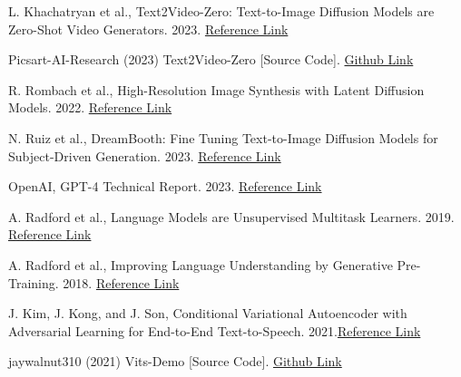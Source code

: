 \documentclass[conference]{IEEEtran}
\begin{document}
\begin{thebibliography}{00}

 L. Khachatryan et al., Text2Video-Zero: Text-to-Image Diffusion Models are Zero-Shot Video Generators. 2023. \href{https://arxiv.org/pdf/2303.13439.pdf}{Reference Link}

 Picsart-AI-Research (2023) Text2Video-Zero [Source Code]. \href{https://github.com/Picsart-AI-Research/Text2Video-Zero}{Github Link}

 R. Rombach et al., High-Resolution Image Synthesis with Latent Diffusion Models. 2022. \href{https://arxiv.org/pdf/2112.10752.pdf}{Reference Link}

 N. Ruiz et al., DreamBooth: Fine Tuning Text-to-Image Diffusion Models for Subject-Driven Generation. 2023. \href{https://arxiv.org/pdf/2208.12242.pdf}{Reference Link}

 OpenAI, GPT-4 Technical Report. 2023. \href{https://arxiv.org/pdf/2303.08774.pdf}{Reference Link}

 A. Radford et al., Language Models are Unsupervised Multitask Learners. 2019. \href{https://d4mucfpksywv.cloudfront.net/better-language-models/language_models_are_unsupervised_multitask_learners.pdf}{Reference Link}

 A. Radford et al., Improving Language Understanding by Generative Pre-Training. 2018. \href{https://s3-us-west-2.amazonaws.com/openai-assets/research-covers/language-unsupervised/language_understanding_paper.pdf}{Reference Link}

 J. Kim, J. Kong, and J. Son, Conditional Variational Autoencoder with Adversarial Learning for End-to-End Text-to-Speech. 2021.\href{https://arxiv.org/pdf/2106.06103.pdf}{Reference Link}

 jaywalnut310 (2021) Vits-Demo [Source Code]. \href{https://jaywalnut310.github.io/vits-demo/index.html}{Github Link}


\end{thebibliography}
\end{document}
